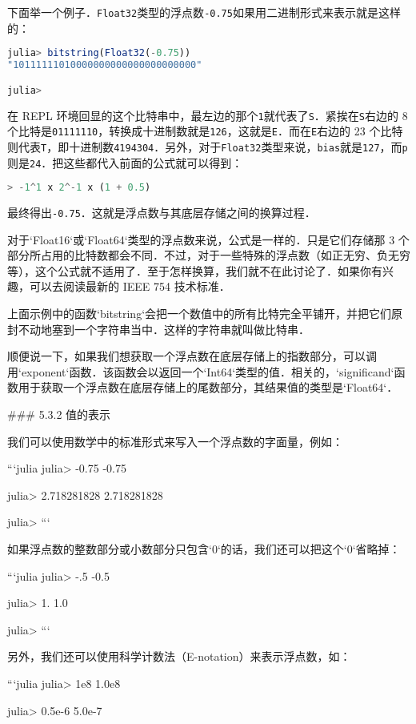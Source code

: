 下面举一个例子．\verb|Float32|类型的浮点数\verb|-0.75|如果用二进制形式来表示就是这样的：

\begin{lstlisting}[language=julia]
julia> bitstring(Float32(-0.75))
"10111111010000000000000000000000"

julia> 
\end{lstlisting}

在 REPL 环境回显的这个比特串中，最左边的那个\verb|1|就代表了\verb|S|．紧挨在\verb|S|右边的 8 个比特是\verb|01111110|，转换成十进制数就是\verb|126|，这就是\verb|E|．而在\verb|E|右边的 23 个比特则代表\verb|T|，即十进制数\verb|4194304|．另外，对于\verb|Float32|类型来说，\verb|bias|就是\verb|127|，而\verb|p|则是\verb|24|．把这些都代入前面的公式就可以得到：
\begin{lstlisting}[language=julia]
> -1^1 x 2^-1 x (1 + 0.5)
\end{lstlisting}
最终得出\verb|-0.75|．这就是浮点数与其底层存储之间的换算过程．

对于`Float16`或`Float64`类型的浮点数来说，公式是一样的．只是它们存储那 3 个部分所占用的比特数都会不同．不过，对于一些特殊的浮点数（如正无穷、负无穷等），这个公式就不适用了．至于怎样换算，我们就不在此讨论了．如果你有兴趣，可以去阅读最新的 IEEE 754 技术标准．

上面示例中的函数`bitstring`会把一个数值中的所有比特完全平铺开，并把它们原封不动地塞到一个字符串当中．这样的字符串就叫做比特串．

顺便说一下，如果我们想获取一个浮点数在底层存储上的指数部分，可以调用`exponent`函数．该函数会以返回一个`Int64`类型的值．相关的，`significand`函数用于获取一个浮点数在底层存储上的尾数部分，其结果值的类型是`Float64`．

### 5.3.2 值的表示

我们可以使用数学中的标准形式来写入一个浮点数的字面量，例如：

```julia
julia> -0.75
-0.75

julia> 2.718281828
2.718281828

julia> 
```

如果浮点数的整数部分或小数部分只包含`0`的话，我们还可以把这个`0`省略掉：

```julia
julia> -.5
-0.5

julia> 1.
1.0

julia> 
```

另外，我们还可以使用科学计数法（E-notation）来表示浮点数，如：

```julia
julia> 1e8
1.0e8

julia> 0.5e-6
5.0e-7

